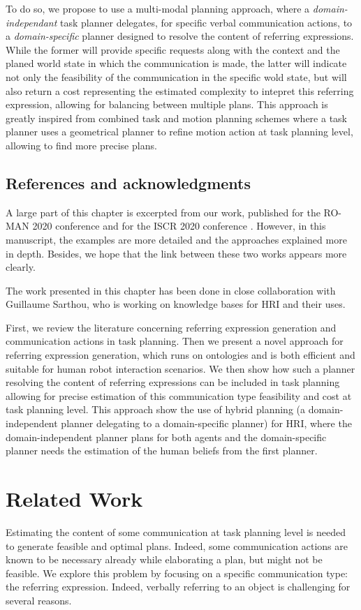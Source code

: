 \documentclass[a4paper,11pt,twoside]{StyleThese}
\begin{document}
To do so, we propose to use a multi-modal planning approach, where a \textit{domain-independant} task planner delegates, for specific verbal communication actions, to a \textit{domain-specific} planner designed to resolve the content of referring expressions. While the former will provide specific requests along with the context and the planed world state in which the communication is made, the latter will indicate not only the feasibility of the communication in the specific wold state, but will also return a cost representing the estimated complexity to intepret this referring expression, allowing for balancing between multiple plans. This approach is greatly inspired from combined task and motion planning schemes \cite{gharbi2015combining} where a task planner uses a geometrical planner to refine motion action at task planning level, allowing to find more precise plans.

\subsection{References and acknowledgments}
A large part of this chapter is excerpted from our work, published for the RO-MAN 2020 conference \cite{buisan2020efficient} and for the ISCR 2020 conference \cite{buisan2020human}. However, in this manuscript, the examples are more detailed and the approaches explained more in depth. Besides, we hope that the link between these two works appears more clearly.

The work presented in this chapter has been done in close collaboration with Guillaume Sarthou, who is working on knowledge bases for HRI and their uses.

First, we review the literature concerning referring expression generation and communication actions in task planning. Then we present a novel approach for referring expression generation, which runs on ontologies and is both efficient and suitable for human robot interaction scenarios. We then show how such a planner resolving the content of referring expressions can be included in task planning allowing for precise estimation of this communication type feasibility and cost at task planning level. This approach show the use of hybrid planning (a domain-independent planner delegating to a domain-specific planner) for HRI, where the domain-independent planner plans for both agents and the domain-specific planner needs the estimation of the human beliefs from the first planner.

\section{Related Work}
Estimating the content of some communication at task planning level is needed to generate feasible and optimal plans. Indeed, some communication actions are known to be necessary already while elaborating a plan, but might not be feasible. We explore this problem by focusing on a specific communication type: the referring expression. Indeed, verbally referring to an object is challenging for several reasons. 
\end{document}
